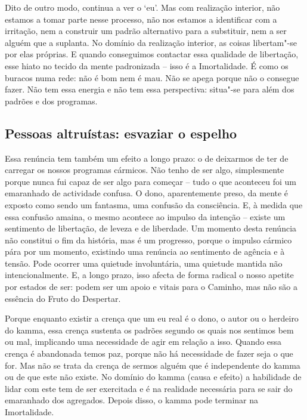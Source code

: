 Dito de outro modo, continua a ver o `eu'. Mas com realização interior, não
estamos a tomar parte nesse processo, não nos estamos a identificar com a
irritação, nem a construir um padrão alternativo para a substituir, nem a ser
alguém que a suplanta. No domínio da realização interior, as coisas libertam"-se
por elas próprias. E quando conseguimos contactar essa qualidade de libertação,
esse hiato no tecido da mente padronizada -- isso é a Imortalidade. É como os
buracos numa rede: não é bom nem é mau. Não se apega porque não o consegue
fazer. Não tem essa energia e não tem essa perspectiva: situa"-se para além dos
padrões e dos programas.

\subsection{Pessoas altruístas: esvaziar o espelho}

Essa renúncia tem também um efeito a longo prazo: o de deixarmos de ter de
carregar os nossos programas cármicos. Não tenho de ser algo, simplesmente
porque nunca fui capaz de ser algo para começar -- tudo o que aconteceu foi um
emaranhado de actividade confusa. O dono, aparentemente preso, da mente é
exposto como sendo um fantasma, uma confusão da consciência. E, à medida que
essa confusão amaina, o mesmo acontece ao impulso da intenção -- existe um
sentimento de libertação, de leveza e de liberdade. Um momento desta renúncia
não constitui o fim da história, mas é um progresso, porque o impulso cármico
pára por um momento, existindo uma renúncia ao sentimento de agência e à tensão.
Pode ocorrer uma quietude involuntária, uma quietude mantida não
intencionalmente. E, a longo prazo, isso afecta de forma radical o nosso apetite
por estados de ser: podem ser um apoio e vitais para o Caminho, mas não são a
essência do Fruto do Despertar.

Porque enquanto existir a crença que um eu real é o dono, o autor ou o herdeiro
do kamma, essa crença sustenta os padrões segundo os quais nos sentimos bem ou
mal, implicando uma necessidade de agir em relação a isso. Quando essa crença é
abandonada temos paz, porque não há necessidade de fazer seja o que for. Mas não
se trata da crença de sermos alguém que é independente do kamma ou de que este
não existe. No domínio do kamma (causa e efeito) a habilidade de lidar com este
tem de ser exercitada e é na realidade necessária para se sair do emaranhado dos
agregados. Depois disso, o kamma pode terminar na Imortalidade.

